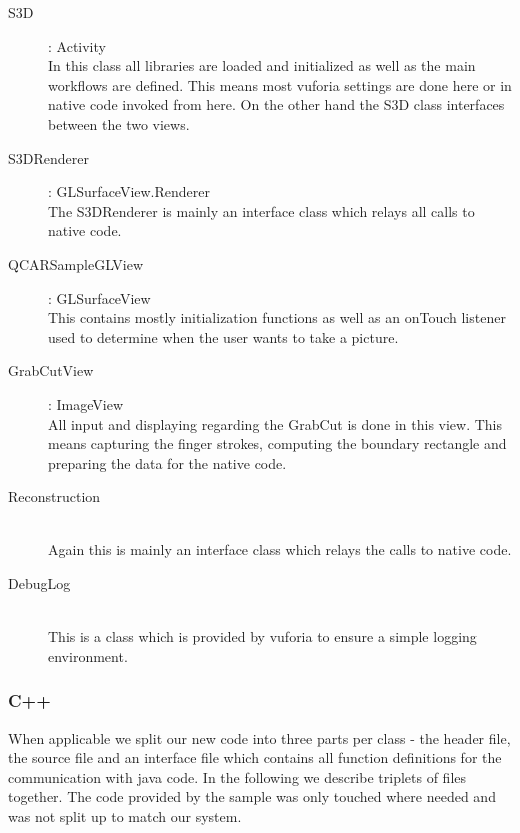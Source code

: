 \documentclass[10pt,twocolumn,letterpaper]{article}
\begin{document}
\begin{description}
	\item[S3D] : Activity \\
		In this class all libraries are loaded and initialized as well as the main workflows are defined. This means most vuforia settings are done here or in native code invoked from here. On the other hand the S3D class interfaces between the two views.
	\item[S3DRenderer] : GLSurfaceView.Renderer\\
		The S3DRenderer is mainly an interface class which relays all calls to native code.
	\item[QCARSampleGLView] : GLSurfaceView\\
		This contains mostly initialization functions as well as an onTouch listener used to determine when the user wants to take a picture.
	\item[GrabCutView] : ImageView\\
		All input and displaying regarding the GrabCut is done in this view. This means capturing the finger strokes, computing the boundary rectangle and preparing the data for the native code.
	\item[Reconstruction] \quad \\
		Again this is mainly an interface class which relays the calls to native code.
	\item[DebugLog] \quad \\
		This is a class which is provided by vuforia to ensure a simple logging environment.
\end{description}

\subsubsection{C++}
When applicable we split our new code into three parts per class - the header file, the source file and an interface file which contains all function definitions for the communication with java code. In the following we describe triplets of files together. The code provided by the sample was only touched where needed and was not split up to match our system.
\end{document}
